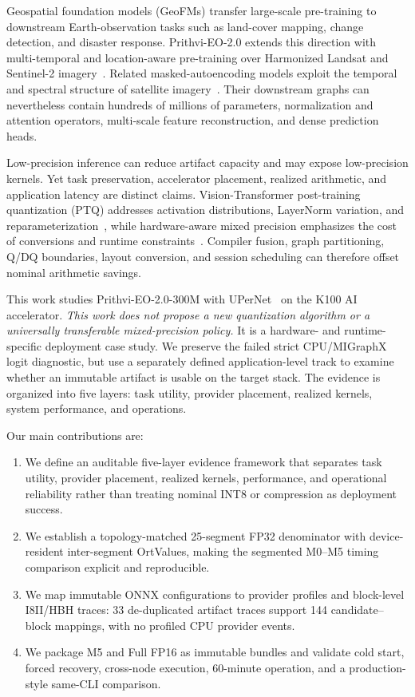 \documentclass[conference]{IEEEtran}
\begin{document}
Geospatial foundation models (GeoFMs) transfer large-scale pre-training to downstream Earth-observation tasks such as land-cover mapping, change detection, and disaster response. Prithvi-EO-2.0 extends this direction with multi-temporal and location-aware pre-training over Harmonized Landsat and Sentinel-2 imagery~\cite{prithvi2024}. Related masked-autoencoding models exploit the temporal and spectral structure of satellite imagery~\cite{satmae2022}. Their downstream graphs can nevertheless contain hundreds of millions of parameters, normalization and attention operators, multi-scale feature reconstruction, and dense prediction heads.

Low-precision inference can reduce artifact capacity and may expose low-precision kernels. Yet task preservation, accelerator placement, realized arithmetic, and application latency are distinct claims. Vision-Transformer post-training quantization (PTQ) addresses activation distributions, LayerNorm variation, and reparameterization~\cite{ptq4vit2022,fqvit2022,repqvit2023}, while hardware-aware mixed precision emphasizes the cost of conversions and runtime constraints~\cite{hawqv3}. Compiler fusion, graph partitioning, Q/DQ boundaries, layout conversion, and session scheduling can therefore offset nominal arithmetic savings.

This work studies Prithvi-EO-2.0-300M with UPerNet~\cite{upernet2018} on the K100 AI accelerator. \emph{This work does not propose a new quantization algorithm or a universally transferable mixed-precision policy.} It is a hardware- and runtime-specific deployment case study. We preserve the failed strict CPU/MIGraphX logit diagnostic, but use a separately defined application-level track to examine whether an immutable artifact is usable on the target stack. The evidence is organized into five layers: task utility, provider placement, realized kernels, system performance, and operations.

Our main contributions are:
\begin{enumerate}
    \item We define an auditable five-layer evidence framework that separates task utility, provider placement, realized kernels, performance, and operational reliability rather than treating nominal INT8 or compression as deployment success.
    \item We establish a topology-matched 25-segment FP32 denominator with device-resident inter-segment OrtValues, making the segmented M0--M5 timing comparison explicit and reproducible.
    \item We map immutable ONNX configurations to provider profiles and block-level I8II/HBH traces: 33 de-duplicated artifact traces support 144 candidate--block mappings, with no profiled CPU provider events.
    \item We package M5 and Full FP16 as immutable bundles and validate cold start, forced recovery, cross-node execution, 60-minute operation, and a production-style same-CLI comparison.
\end{enumerate}
\end{document}
